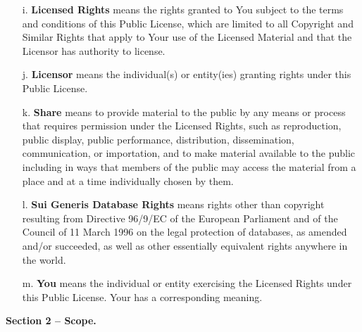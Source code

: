\begin{itemize}
    \item[i.] \textbf{Licensed Rights} means the rights granted to You subject to the terms and conditions of this Public License, which are limited to all Copyright and Similar Rights that apply to Your use of the Licensed Material and that the Licensor has authority to license.
    \item[j.] \textbf{Licensor} means the individual(s) or entity(ies) granting rights under this Public License.
    \item[k.] \textbf{Share} means to provide material to the public by any means or process that requires permission under the Licensed Rights, such as reproduction, public display, public performance, distribution, dissemination, communication, or importation, and to make material available to the public including in ways that members of the public may access the material from a place and at a time individually chosen by them.
    \item[l.] \textbf{Sui Generis Database Rights} means rights other than copyright resulting from Directive 96/9/EC of the European Parliament and of the Council of 11 March 1996 on the legal protection of databases, as amended and/or succeeded, as well as other essentially equivalent rights anywhere in the world.
    \item[m.] \textbf{You} means the individual or entity exercising the Licensed Rights under this Public License. Your has a corresponding meaning.
\end{itemize}

\begin{center}
    \textbf{Section 2 -- Scope.}
\end{center}

